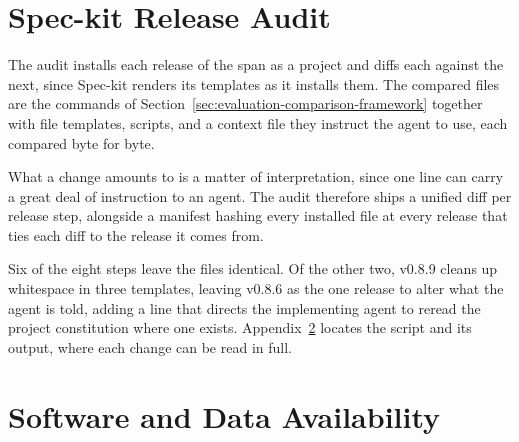 
\section{Spec-kit Release Audit}
\label{app:evaluation-speckit-audit}

The audit installs each release of the span as a project and diffs each against the next, since Spec-kit renders its templates as it installs them. The compared files are the commands of Section~\ref{sec:evaluation-comparison-framework} together with file templates, scripts, and a context file they instruct the agent to use, each compared byte for byte.

What a change amounts to is a matter of interpretation, since one line can carry a great deal of instruction to an agent. The audit therefore ships a unified diff per release step, alongside a manifest hashing every installed file at every release that ties each diff to the release it comes from.

Six of the eight steps leave the files identical. Of the other two, v0.8.9 cleans up whitespace in three templates, leaving v0.8.6 as the one release to alter what the agent is told, adding a line that directs the implementing agent to reread the project constitution where one exists. Appendix~\ref{app:evaluation-availability} locates the script and its output, where each change can be read in full.

\section{Software and Data Availability}
\label{app:evaluation-availability}

